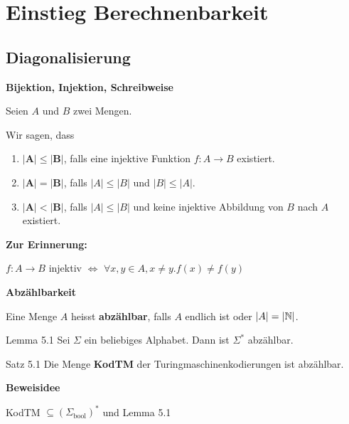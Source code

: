 \section{Einstieg Berechnenbarkeit}
        
\subsection{Diagonalisierung}


    \textbf{Bijektion, Injektion, Schreibweise}
    \begin{mainbox}{}
        Seien $A$ und $B$ zwei Mengen.

        Wir sagen, dass 
        \begin{enumerate}[label=\roman*.]
            \item $\mathbf{|A| \leq |B|}$, falls eine injektive Funktion $f: A \to B$ existiert.
            \item $\mathbf{|A| = |B|}$, falls $|A| \leq |B|$ und $|B| \leq |A|$.
            \item $\mathbf{|A| < |B|}$, falls $|A| \leq |B|$ und keine injektive Abbildung von $B$ nach $A$ existiert.
        \end{enumerate}
    \end{mainbox}
    \textbf{Zur Erinnerung:}
    \begin{center}
        $f: A \to B$ injektiv $\iff $ $\forall x,y \in A, x\neq y. f(x) \neq f(y)$
    \end{center}



    \textbf{Abzählbarkeit}
    \begin{mainbox}{}
        Eine Menge $A$ heisst \textbf{abzählbar}, falls $A$ endlich ist oder $|A| = |\mathbb{N}|$.
    \end{mainbox}
    \begin{subbox}{Lemma 5.1}
    Sei $\Sigma$ ein beliebiges Alphabet. Dann ist $\Sigma^*$ abzählbar.
    \end{subbox}


    \begin{mainbox}{Satz 5.1}
        Die Menge \textbf{KodTM} der Turingmaschinenkodierungen ist abzählbar.
    \end{mainbox}
    \textbf{Beweisidee}

    KodTM $\subseteq (\Sigma_{\text{bool}})^*$ und Lemma 5.1

